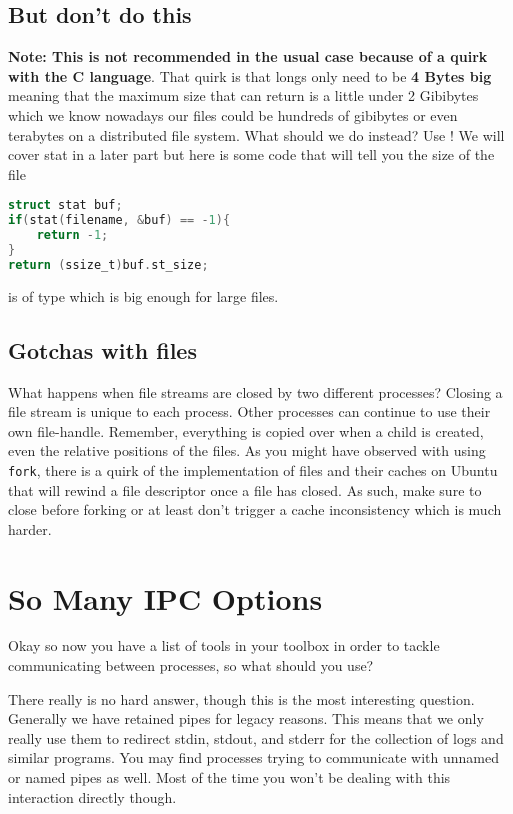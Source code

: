 \subsection{But don't do this}

\textbf{Note: This is not recommended in the usual case because of a quirk with the C language}.
That quirk is that longs only need to be \textbf{4 Bytes big} meaning that the maximum size that  can return is a little under 2 Gibibytes which we know nowadays our files could be hundreds of gibibytes or even terabytes on a distributed file system.
What should we do instead? Use ! We will cover stat in a later part but here is some code that will tell you the size of the file

\begin{lstlisting}[language=C]
struct stat buf;
if(stat(filename, &buf) == -1){
    return -1;
}
return (ssize_t)buf.st_size;
\end{lstlisting}

 is of type  which is big enough for large files.

\subsection{Gotchas with files}

What happens when file streams are closed by two different processes?
Closing a file stream is unique to each process.
Other processes can continue to use their own file-handle. Remember, everything is copied over when a child is created, even the relative positions of the files. As you might have observed with using \texttt{fork}, there is a quirk of the implementation of files and their caches on Ubuntu that will rewind a file descriptor once a file has closed. As such, make sure to close before forking or at least don't trigger a cache inconsistency which is much harder.

\section{So Many IPC Options}

Okay so now you have a list of tools in your toolbox in order to tackle communicating between processes, so what should you use?

There really is no hard answer, though this is the most interesting question. Generally we have retained pipes for legacy reasons. This means that we only really use them to redirect stdin, stdout, and stderr for the collection of logs and similar programs. You may find processes trying to communicate with unnamed or named pipes as well. Most of the time you won't be dealing with this interaction directly though.

